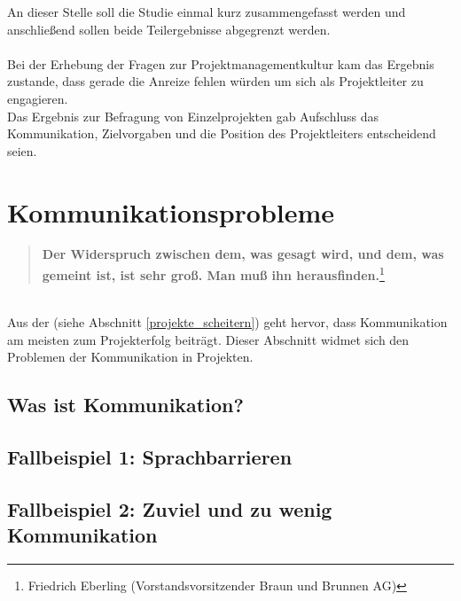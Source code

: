 \documentclass[12pt]{scrartcl}
\begin{document}
An dieser Stelle soll die Studie einmal kurz zusammengefasst werden und anschließend sollen beide Teilergebnisse abgegrenzt werden. \\
\\
Bei der Erhebung der Fragen zur Projektmanagementkultur kam das Ergebnis zustande, dass gerade die Anreize fehlen würden um sich als Projektleiter zu engagieren. \\
Das Ergebnis zur Befragung von Einzelprojekten gab Aufschluss das Kommunikation, Zielvorgaben und die Position des Projektleiters entscheidend seien.

\pagebreak
\section{Kommunikationsprobleme}

\begin{quote}
\colorbox{blue!5}{\textbf{Der Widerspruch zwischen dem, was gesagt wird, und dem, was gemeint ist, ist sehr groß. Man muß ihn herausfinden.}}\footnote{Friedrich Eberling (Vorstandsvorsitzender Braun und Brunnen AG)}
\end{quote}
\ \\
Aus der \cite{GPM_Studie_2008} (siehe Abschnitt \ref{projekte_scheitern}) geht hervor, dass Kommunikation am meisten zum Projekterfolg beiträgt. Dieser Abschnitt widmet sich den Problemen der Kommunikation in Projekten. 

\subsection{Was ist Kommunikation?}

\subsection{Fallbeispiel 1: Sprachbarrieren}

\subsection{Fallbeispiel 2: Zuviel und zu wenig Kommunikation}


\cite{profPM}
\cite{scriptPM}
\cite{chaosReportCriteria}
\end{document}
